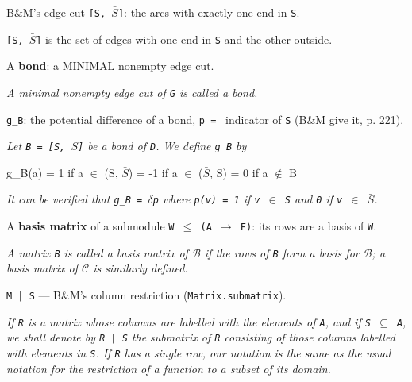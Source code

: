 \begin{definition}
\label{CycleSpace.edgeCutSet}
\leanok
B\&M's edge cut \texttt{[S, $\bar{S}$]}: the arcs with exactly one end in \texttt{S}.

\texttt{[S, $\bar{S}$]} is the set of edges
with one end in \texttt{S} and the other outside.
\end{definition}

\begin{definition}
\label{CycleSpace.IsBond}
\leanok
{}
A \textbf{bond}: a MINIMAL nonempty edge cut.

\emph{A minimal nonempty edge cut of \texttt{G} is
called a bond.}
\end{definition}

\begin{definition}[$g_B$: the potential difference of a bond, $p =$ indicator of $S$ (B\&M give it, p. 221)]
\label{CycleSpace.bondPotentialDiff}
\leanok
\texttt{g\_B}: the potential difference of a bond, \texttt{p = } indicator of \texttt{S} (B\&M give it, p. 221).

\emph{Let \texttt{B = [S, $\bar{S}$]} be a bond of \texttt{D}.  We
define \texttt{g\_B} by}

g\_B(a) = 1   if a $\in$ (S, $\bar{S}$)
           = -1  if a $\in$ ($\bar{S}$, S)
           = 0   if a $\notin$ B

\emph{It can be verified that \texttt{g\_B = $\delta$p} where \texttt{p(v) = 1} if
\texttt{v $\in$ S} and \texttt{0} if
\texttt{v $\in$ $\bar{S}$}.}
\end{definition}

\begin{definition}
\label{CycleSpace.IsBasisMatrix}
\leanok
A \textbf{basis matrix} of a submodule \texttt{W $\le$ (A $\to$ F)}: its rows are a
basis of \texttt{W}.

\emph{A matrix \texttt{B} is called a basis matrix of
\texttt{$\mathcal{B}$} if the rows of \texttt{B} form a basis for \texttt{$\mathcal{B}$}; a basis matrix of \texttt{$\mathcal{C}$} is similarly
defined.}
\end{definition}

\begin{definition}
\label{CycleSpace.restrictCols}
\leanok
\texttt{M | S} --- B\&M's column restriction (\texttt{Matrix.submatrix}).

\emph{If \texttt{R} is a matrix whose columns are labelled with
the elements of \texttt{A}, and if \texttt{S $\subseteq$ A}, we shall denote by
\texttt{R | S} the submatrix of
\texttt{R} consisting of those columns labelled with elements in \texttt{S}.  If \texttt{R} has a
single row, our notation is the same as the usual notation for the restriction of
a function to a subset of its domain.}
\end{definition}

